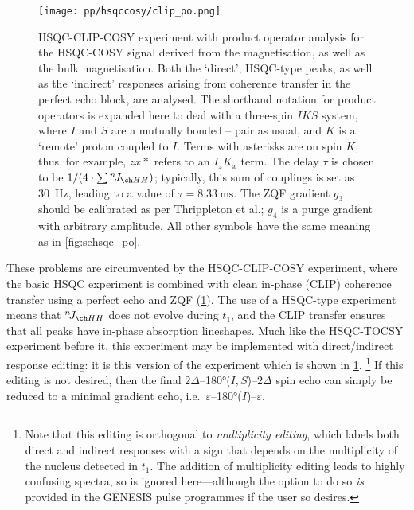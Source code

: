 \begin{figure}[!ht]
    \centering
    \texttt{[image: pp/hsqccosy/clip\_po.png]}%
    \caption[HSQC-CLIP-COSY experiment]{
        HSQC-CLIP-COSY experiment with product operator analysis for the HSQC-COSY signal derived from the  magnetisation, as well as the bulk  magnetisation.
        Both the `direct', HSQC-type peaks, as well as the `indirect' responses arising from coherence transfer in the perfect echo block, are analysed.
        The shorthand notation for product operators is expanded here to deal with a three-spin $IKS$ system, where $I$ and $S$ are a mutually bonded \proton{}--\carbon{} pair as usual, and $K$ is a `remote' proton coupled to $I$.
        Terms with asterisks are on spin $K$; thus, for example, $zx*$ refers to an $I_zK_x$ term.
        The delay $\tau$ is chosen to be $1 / (4 \cdot \sum \nJ{HH})$; typically, this sum of couplings is set as \qty{30}{Hz}, leading to a value of $\tau = \qty{8.33}{\ms}$.
        The ZQF gradient $g_3$ should be calibrated as per Thrippleton et al.\autocite{Thrippleton2003ACIE}; $g_4$ is a purge gradient with arbitrary amplitude.
        All other symbols have the same meaning as in \cref{fig:sehsqc_po}.
    }
    \label{fig:hsqcc_clip_po}
\end{figure}

These problems are circumvented by the HSQC-CLIP-COSY experiment\autocite{Gyongyosi2018CPC,Gyongyosi2021AC}, where the basic HSQC experiment is combined with clean in-phase (CLIP) coherence transfer using a perfect echo\autocite{Aguilar2012CC,Parella2019MRC,Koos2016ACIE} and ZQF\autocite{Thrippleton2003ACIE} (\cref{fig:hsqcc_clip_po}).
The use of a HSQC-type experiment means that $\nJ{HH}$ does not evolve during $t_1$, and the CLIP transfer ensures that all peaks have in-phase absorption lineshapes.
Much like the HSQC-TOCSY experiment before it, this experiment may be implemented with direct/indirect response editing: it is this version of the experiment which is shown in \cref{fig:hsqcc_clip_po}.%
\footnote{Note that this editing is orthogonal to \textit{multiplicity editing}, which labels both direct and indirect responses with a sign that depends on the multiplicity of the \carbon{} nucleus detected in $t_1$. The addition of multiplicity editing leads to highly confusing spectra, so is ignored here---although the option to do so \textit{is} provided in the GENESIS pulse programmes if the user so desires.}
If this editing is not desired, then the final $2\Delta$--\ang{180}($I,S$)--$2\Delta$ spin echo can simply be reduced to a minimal gradient echo, i.e.\ $\varepsilon$--\ang{180}($I$)--$\varepsilon$.

